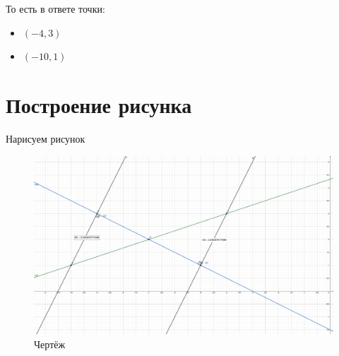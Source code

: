 \documentclass[12pt, a4paper]{article}
\begin{document}
    То есть в ответе точки:
    \begin{itemize}
        \item $(-4, 3)$
        \item $(-10, 1)$
    \end{itemize}


    \section{Построение рисунка}

    Нарисуем рисунок

    \begin{figure}
        \centering
        \includegraphics[width=\paperwidth]{resources/1.4_figure.pdf}
        \caption{Чертёж}
        \label{fig:main_figure}
    \end{figure}
    \FloatBarrier
\end{document}
